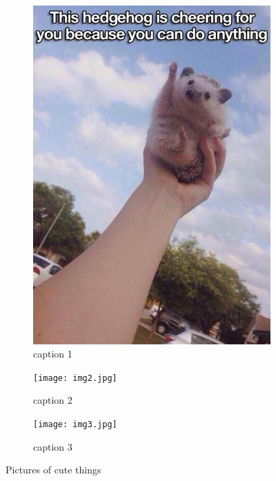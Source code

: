 \begin{figure}[H]
    \centering
    \begin{subfigure}[b]{0.3\textwidth}
        \includegraphics[width=\textwidth]{img1.jpg}
        \caption{caption 1}
    \end{subfigure}
    \begin{subfigure}[b]{0.3\textwidth}
        \texttt{[image: img2.jpg]}
        \caption{caption 2}
    \end{subfigure}
    \begin{subfigure}[b]{0.3\textwidth}
        \texttt{[image: img3.jpg]}
        \caption{caption 3}
    \end{subfigure}
    \caption{Pictures of cute things}
\end{figure}